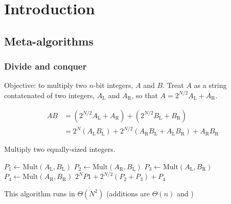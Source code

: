 \chapter{Introduction}
\section{Meta-algorithms}
\subsection{Divide and conquer}
Objective: to multiply two \(n\)-bit integers, \(A\) and \(B\).
Treat \(A\) as a string contatenated of two integers, \(A_\text{L}\) and \(A_\text{R}\),
so that \(A = 2^{N/2}A_\text{L} + A_\text{R}\).

\begin{align}
	AB &= \left(2^{N/2} A_\text{L} + A_\text{R}\right) + \left(2^{N/2} B_\text{L} + B_\text{R}\right) \\
		&= 2^N\left(A_\text{L}B_\text{L}\right) + 2^{N/2}\left(A_\text{R}B_\text{L} + A_\text{L}B_\text{R}\right) + A_\text{R}B_\text{R}
\end{align}
\begin{algorithm}
	\caption{Multiply two equally-sized integers.}
	\begin{algorithmic}
		\State \(P_1 \leftarrow \text{Mult}(A_\text{L}, B_\text{L})\)
		\State \(P_2 \leftarrow \text{Mult}(A_\text{R}, B_\text{L})\)
		\State \(P_3 \leftarrow \text{Mult}(A_\text{L}, B_\text{R})\)
		\State \(P_4 \leftarrow \text{Mult}(A_\text{R}, B_\text{R})\)
		\State\Return \(2^NP1 + 2^{N/2}\left(P_2 + P_3\right) + P_4\)
		\EndFunction
	\end{algorithmic}
\end{algorithm}

This algorithm runs in \(\Theta(N^2)\) (additions are \(\Theta(n)\) and \(\))